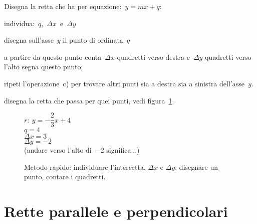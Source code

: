 \begin{procedura}
 Disegna la retta che ha per equazione:~\(y=mx+q\):
 \begin{enumeratea}
  \item individua:~\(q\),~\(\Delta x\)~e~\(\Delta y\)
  \item disegna sull'asse~\(y\) il punto di ordinata~\(q\)
  \item a partire da questo punto conta~\(\Delta x\) quadretti verso destra
   e~\(\Delta y\) quadretti verso l'alto segna questo punto;
  \item ripeti l'operazione~c) per trovare altri punti sia a destra sia
   a sinistra dell'asse~\(y\).
  \item disegna la retta che passa per quei punti, 
   vedi figura~\ref{fig:metodorapido}.
 \end{enumeratea}
\end{procedura}

\begin{inaccessibleblock}
 \begin{figure}[h]
 \centering
 \begin{minipage}[]{.30\textwidth}
  \begin{center}
   \(r:~y = - \dfrac{2}{3}x + 4\)\\[.5em]

   \(q = 4\)\\[.5em]

   \(\Delta x = 3\)\\[.5em]

   \(\Delta y = -2\)\\[.5em]
   
   (andare verso l'alto di~\(-2\) significa...)
  \end{center}
 \end{minipage}
 \begin{minipage}[]{.60\textwidth}
   \centering \metodorapido %
 \end{minipage}
  \caption{Metodo rapido: individuare l'intercetta, 
\(\Delta x\) e \(\Delta y\); disegnare un punto, contare i quadretti.} 
\label{fig:metodorapido}
\end{figure}
\end{inaccessibleblock}


\section{Rette parallele e perpendicolari}
\label{sec:retta_paralleleleperpendicolari}

